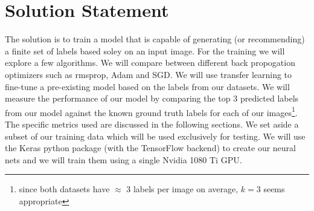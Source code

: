 \documentclass[10pt, a4paper, twocolumn]{article} %
\begin{document}

\section{Solution Statement}\label{sec:4} %



The solution is to train a model that is capable of generating (or recommending) a finite set of labels based soley on an input image.  For the training we will explore a few algorithms.  We will compare between different back propogation optimizers such as rmsprop, Adam and SGD.  We will use transfer learning to fine-tune a pre-existing model based on the labels from our datasets.  We will measure the performance of our model by comparing the top 3 predicted labels from our model against the known ground truth labels for each of our images\footnote{since both datasets have $\approx$ 3 labels per image on average, $k = 3$ seems appropriate}.  The specific metrics used are discussed in the following sections. We set aside a subset of our training data which will be used exclusively for testing. We will use the Keras python package (with the TensorFlow backend) to create our neural nets and we will train them using a single Nvidia 1080 Ti GPU.
\end{document}
